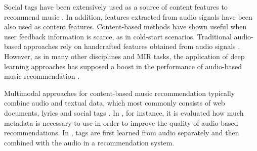 

Social tags have been extensively used as a source of content features to recommend music \citep{Knees2013}. In addition, features extracted from audio signals have been also used as content features. Content-based methods have shown useful when user feedback information is scarce, as in cold-start scenarios. Traditional audio-based approaches rely on handcrafted features obtained from audio signals \citep{Bogdanov2013}. However, as in many other disciplines and MIR tasks, the application of deep learning approaches has supposed a boost in the performance of audio-based music recommendation \citep{Oord2013}. 

Multimodal approaches for content-based music recommendation typically combine audio and textual data, which most commonly consists of web documents, lyrics and social tags \citep{liem2011need}. In \citep{Bogdanov2011}, for instance, it is evaluated how much metadata is necessary to use in order to improve the quality of audio-based recommendations. In \citep{Eck:NIPS2007}, tags are first learned from audio separately and then combined with the audio in a recommendation system. 

